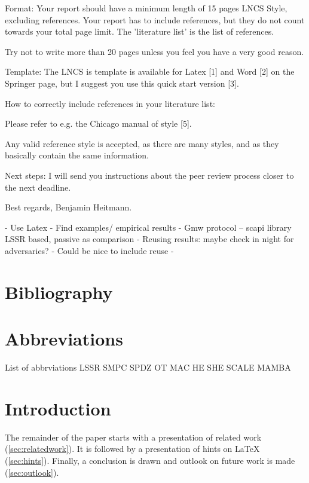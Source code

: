 \documentclass[english,runningheads,a4paper]{llncs}[2018/03/10]
\begin{document}
Format: 
Your report should have a minimum length of 15 pages LNCS Style, excluding references. 
Your report has to include references, but they do not count towards your total page limit. The 'literature list' is the list of references. 

Try not to write more than 20 pages unless you feel you have a very good reason. 

Template: 
The LNCS is template is available for Latex [1] and Word [2] on the Springer page, 
but I suggest you use this quick start version [3]. 

How to correctly include references in your literature list: 

Please refer to e.g. the Chicago manual of style [5].

Any valid reference style is accepted, as there are many styles, and as they basically contain the same information. 



Next steps: 
I will send you instructions about the peer review process closer to the next deadline.



Best regards, Benjamin Heitmann.



-	Use Latex
-	Find examples/ empirical results
-	Gmw protocol – scapi library LSSR based, passive as comparison
-	Reusing results: maybe check in night for adversaries?
-	Could be nice to include reuse
-	



\section{Bibliography}\label{sec:biblio}


\section{Abbreviations}\label{sec:abb}


List of abbrviations
LSSR
SMPC
SPDZ
OT
MAC
HE
SHE
SCALE
MAMBA




\section{Introduction}\label{sec:intro}

The remainder of the paper starts with a presentation of related work (\cref{sec:relatedwork}).
It is followed by a presentation of hints on \LaTeX{} (\cref{sec:hints}).
Finally, a conclusion is drawn and outlook on future work is made (\cref{sec:outlook}).
\end{document}
